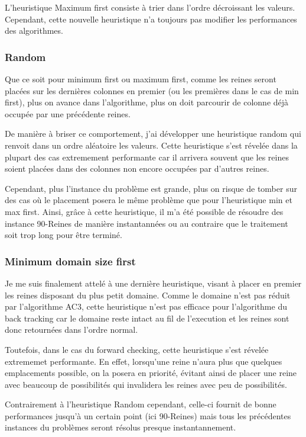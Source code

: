 \documentclass[a4paper,10pt]{article}
\begin{document}
L'heuristique Maximum first consiste à trier dans l'ordre décroissant les valeurs. Cependant, cette nouvelle heuristique n'a toujours pas modifier les performances des algorithmes.

\subsubsection{Random}

Que ce soit pour minimum first ou maximum first, comme les reines seront placées sur les dernières colonnes en premier (ou les premières dans le cas de min first), plus on avance dans l'algorithme, plus on doit parcourir de colonne déjà occupée par une précédente reines.

De manière à briser ce comportement, j'ai développer une heuristique random qui renvoit dans un ordre aléatoire les valeurs. Cette heuristique s'est révelée dans la plupart des cas extremement performante car il arrivera souvent que les reines soient placées dans des colonnes non encore occupées par d'autres reines.

Cependant, plus l'instance du problème est grande, plus on risque de tomber sur des cas où le placement posera le même problème que pour l'heuristique min et max first. Ainsi, grâce à cette heuristique, il m'a été possible de résoudre des instance 90-Reines de manière instantannées ou au contraire que le traitement soit trop long pour être terminé.

\subsubsection{Minimum domain size first}

Je me suis finalement attelé à une dernière heuristique, visant à placer en premier les reines disposant du plus petit domaine. Comme le domaine n'est pas réduit par l'algorithme AC3, cette heuristique n'est pas efficace pour l'algorithme du back tracking car le domaine reste intact au fil de l'execution et les reines sont donc retournées dans l'ordre normal.

Toutefois, dans le cas du forward checking, cette heuristique s'est révelée extrememet performante. En effet, lorsqu'une reine n'aura plus que quelques emplacements possible, on la posera en priorité, évitant ainsi de placer une reine avec beaucoup de possibilités qui invalidera les reines avec peu de possibilités.

Contrairement à l'heuristique Random cependant, celle-ci fournit de bonne performances jusqu'à un certain point (ici 90-Reines) mais tous les précédentes instances du problèmes seront résolus presque instantannement.
\end{document}
